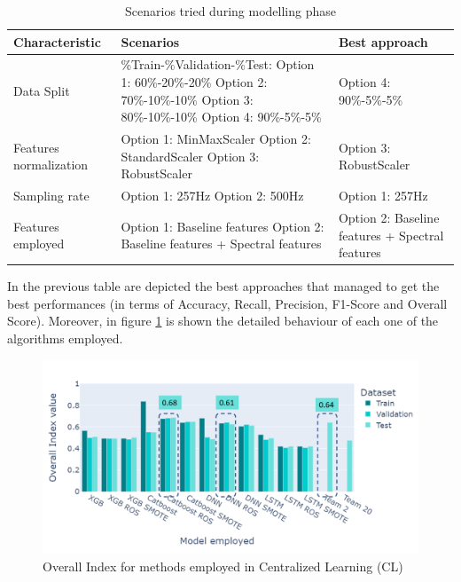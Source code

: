 \begin{table}[H]
\begin{center}
\begin{tabular}{ ||p{3cm}||p{5cm}||p{4cm}|| }
 \hline
\textbf{Characteristic} & \textbf{Scenarios} & \textbf{Best approach}\\ [0.4ex] 
 \hline\hline
 Data Split & \%Train-\%Validation-\%Test: Option 1: 60\%-20\%-20\% Option 2: 70\%-10\%-10\% Option 3: 80\%-10\%-10\% Option 4: 90\%-5\%-5\% & Option 4: 90\%-5\%-5\%\\
\hline
Features normalization & Option 1: MinMaxScaler \hspace{10 mm} Option 2: StandardScaler \hspace{10 mm} Option 3: RobustScaler & Option 3: RobustScaler \\
\hline
Sampling rate & Option 1: 257Hz \hspace{10 mm} Option 2: 500Hz & Option 1: 257Hz \\
\hline
Features employed & Option 1: Baseline features Option 2: Baseline features + Spectral features & Option 2: Baseline features + Spectral features \\
\hline\hline
\end{tabular}
\end{center}
\caption{Scenarios tried during modelling phase}
\label{table:scenarios_models}
\end{table}

In the previous table are depicted the best approaches that managed to get the best performances (in terms of Accuracy, Recall, Precision, F1-Score and Overall Score). Moreover, in figure \ref{fig:cl_oindex_methods} is shown the detailed behaviour of each one of the algorithms employed.

\begin{figure}[H]
\centering
\includegraphics[scale=0.5]{img/cl_oindex_methods.png}
\caption{Overall Index for methods employed in Centralized Learning (CL)}
\label{fig:cl_oindex_methods}
\end{figure}


